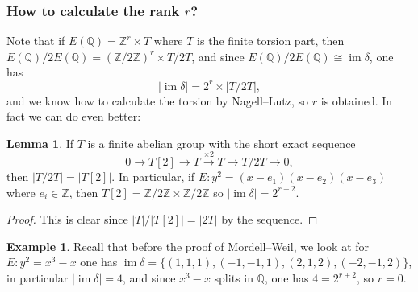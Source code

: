\documentclass{article}
\newcommand{\Z}{\mathbb{Z}}
\newcommand{\Q}{\mathbb{Q}}
\newcommand{\im}{\operatorname{im}}
\theoremstyle{definition}
\newtheorem{lemma}[defn]{Lemma}
\newtheorem{example}[defn]{Example}
\begin{document}
\subsubsection{How to calculate the rank $r$?}
Note that if $E(\Q)=\Z^r\times T$ where $T$ is the finite torsion part, then $E(\Q)/2E(\Q)=(\Z/2\Z)^r\times T/2T$, and since $E(\Q)/2E(\Q)\cong\im\delta$, one has
\[
|\!\im\delta|=2^r\times |T/2T|,
\]
and we know how to calculate the torsion by Nagell--Lutz, so $r$ is obtained. In fact we can do even better:

\begin{lemma}
If $T$ is a finite abelian group with the short exact sequence
\[
0\rightarrow T[2]\rightarrow T\xrightarrow{\times 2}T\rightarrow T/2T\rightarrow 0,
\]
then $|T/2T|=|T[2]|$. In particular, if $E:y^2=(x-e_1)(x-e_2)(x-e_3)$ where $e_i\in\Z$, then $T[2]=\Z/2\Z\times\Z/2\Z$ so $|\!\im\delta|=2^{r+2}$.
\end{lemma}
\begin{proof}
This is clear since $|T|/|T[2]|=|2T|$ by the sequence.
\end{proof}

\begin{example}
Recall that before the proof of Mordell--Weil, we look at for $E:y^2=x^3-x$ one has $\im\delta=\{(1,1,1),(-1,-1,1),(2,1,2),(-2,-1,2)\}$, in particular $|\!\im\delta|=4$, and since $x^3-x$ splits in $\Q$, one has $4=2^{r+2}$, so $r=0$.
\end{example}
\end{document}
